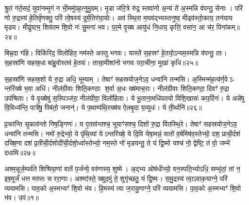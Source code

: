 श्रु॒तं ग॑र्त॒सदं॒ युवा॑नम्मृ॒गं न भी॒ममु॑पह॒त्नुमु॒ग्रम्। मृ॒डा ज॑रि॒त्रे रु॑द्र॒ स्तवा॑नो अ॒न्यं ते॑ अ॒स्मन्नि व॑पन्तु॒ सेनाः। परि॑ णो रु॒द्रस्य॑ हे॒तिर्वृ॑णक्तु॒ परि॑ त्वे॒षस्य॑ दुर्म॒तिर॑घा॒योः। अव॑ स्थि॒रा म॒घव॑द्भ्यस्तनुष्व॒ मीढ्व॑स्तो॒काय॒ तन॑याय मृडय। मीढु॑ष्टम॒ शिव॑तम शि॒वो नः॑ सु॒मना॑ भव। प॒र॒मे वृ॒ख्ष आयु॑धं नि॒धाय॒ कृत्तिं॒ वसा॑न॒ आ च॑र॒ पिना॑कम्॥२४॥

बिभ्र॒दा ग॑हि। विकि॑रिद॒ विलो॑हित॒ नम॑स्ते अस्तु भगवः। यास्ते॑ स॒हस्रꣳ॑ हे॒तयो॒ऽन्यम॒स्मन्नि व॑पन्तु॒ ताः। स॒हस्रा॑णि सहस्र॒धा बा॑हु॒वोस्तव॑ हे॒तयः॑। तासा॒मीशा॑नो भगवः परा॒चीना॒ मुखा॑ कृधि॥२५॥

{\anuvakamend[{अ॒स्मि स्त॒नुवः॑ स्तु॒हि पिना॑क॒मेका॒न्नत्रि॒ꣳ॒शच्च॑॥10॥}]}

स॒हस्रा॑णि सहस्र॒शो ये रु॒द्रा अधि॒ भूम्याम्। तेषाꣳ॑ सहस्रयोज॒नेऽव॒ धन्वा॑नि तन्मसि। अ॒स्मिन्म॑ह॒त्य॑र्ण॒वेऽ- न्तरि॑ख्षे भ॒वा अधि॑। नील॑ग्रीवाः शिति॒कण्ठाः श॒र्वा अ॒धः ख्ष॑माच॒राः। नील॑ग्रीवाः शिति॒कण्ठा॒ दिवꣳ॑ रु॒द्रा उप॑श्रिताः। ये वृ॒ख्षेषु॑ स॒स्पिञ्ज॑रा॒ नील॑ग्रीवा॒ विलो॑हिताः। ये भू॒ताना॒मधि॑पतयो विशि॒खासः॑ कप॒र्दिनः॑। ये अन्ने॑षु वि॒विध्य॑न्ति॒ पात्रे॑षु॒ पिब॑तो॒ जनान्॑। ये प॒थाम्प॑थि॒रख्ष॑य ऐलबृ॒दा य॒व्युधः॑। ये ती॒र्थानि॑॥२६॥

प्र॒चर॑न्ति सृ॒काव॑न्तो निष॒ङ्गिणः॑। य ए॒ताव॑न्तश्च॒ भूयाꣳ॑सश्च॒ दिशो॑ रु॒द्रा वि॑तस्थि॒रे। तेषाꣳ॑ सहस्रयोज॒नेऽव॒ धन्वा॑नि तन्मसि। नमो॑ रु॒द्रेभ्यो॒ ये पृ॑थि॒व्यां येऽन्तरि॑ख्षे॒ ये दि॒वि येषा॒मन्नं॒ वातो॑ व॒र्\mbox{}षमिष॑व॒स्तेभ्यो॒ दश॒ प्राची॒र्दश॑ दख्षि॒णा दश॑ प्र॒तीची॒र्दशोदी॑ची॒र्दशो॒र्ध्वास्तेभ्यो॒ नम॒स्ते नो॑ मृडयन्तु॒ ते यं द्वि॒ष्मो यश्च॑ नो॒ द्वेष्टि॒ तं वो॒ जम्भे॑ दधामि॥२७॥


{\anuvakamend[{ती॒र्थानि॒ यश्च॒ षट्च॑॥11॥}]}

{}

{}

\setcounter{anuvakam}{0}
अश्म॒न्नूर्ज॒म्पर्व॑ते शिश्रिया॒णां वाते॑ प॒र्जन्ये॒ वरु॑णस्य॒ शुष्मे। अ॒द्भ्य ओष॑धीभ्यो॒ वन॒स्पति॒भ्योऽधि॒ सम्भृ॑तां॒ तां न॒ इष॒मूर्जं॑ धत्त मरुतः सररा॒णाः। अश्मꣵ॑स्ते॒ ख्षुद॒मुं ते॒ शुगृ॑च्छतु॒ यं द्वि॒ष्मः। स॒मु॒द्रस्य॑ त्वा॒ऽवाक॒याग्ने॒ परि॑ व्ययामसि। पाव॒को अ॒स्मभ्यꣳ॑ शि॒वो भ॑व। हि॒मस्य॑ त्वा ज॒रायु॒णाग्ने॒ परि॑ व्ययामसि। पा॒व॒को अ॒स्मभ्यꣳ॑ शि॒वो भ॑व। उप॑॥१॥

